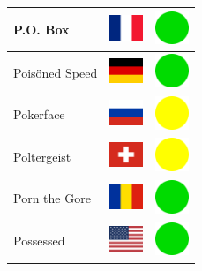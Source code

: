 \documentclass[12pt, a4paper, twoside]{report}
\begin{document}
\begin{center}
\begin{longtable}{|p{5cm}|p{2cm}|p{2cm}|}
 P.O. Box                                                   & \includegraphics[width=1cm]{../img/flags/fr} &   \includegraphics[width=1cm]{../likes/y} \\ \hline
 Poisöned Speed                                             & \includegraphics[width=1cm]{../img/flags/de} &   \includegraphics[width=1cm]{../likes/y} \\ \hline
 Pokerface                                                  & \includegraphics[width=1cm]{../img/flags/ru} &   \includegraphics[width=1cm]{../likes/m} \\ \hline
 Poltergeist                                                & \includegraphics[width=1cm]{../img/flags/ch} &   \includegraphics[width=1cm]{../likes/m} \\ \hline
 Porn the Gore                                              & \includegraphics[width=1cm]{../img/flags/ro} &   \includegraphics[width=1cm]{../likes/y} \\ \hline
 Possessed                                                  & \includegraphics[width=1cm]{../img/flags/us} &   \includegraphics[width=1cm]{../likes/y} \\ \hline

\end{longtable}
\end{center}
\end{document}
